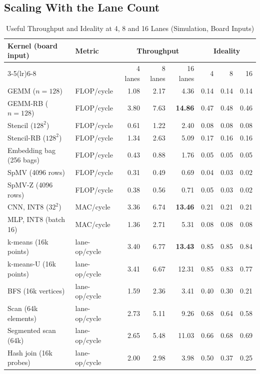 \documentclass[journal]{IEEEtran}
\begin{document}
\subsection{Scaling With the Lane Count}\label{sec:evallanes}
\begin{table}[t]
\caption{Useful Throughput and Ideality at 4, 8 and 16 Lanes (Simulation, Board Inputs)}
\label{tab:lanes_tp}
\centering\footnotesize
\setlength{\tabcolsep}{4.5pt}
\begin{tabular}{llrrrrrr}
\toprule
Kernel (board input) & Metric & \multicolumn{3}{c}{Throughput} & \multicolumn{3}{c}{Ideality}\\
\cmidrule(lr){3-5}\cmidrule(lr){6-8}
 & & 4 lanes & 8 lanes & 16 lanes & 4 & 8 & 16\\
\midrule
GEMM ($n=128$)             & FLOP/cycle    & 1.08 & 2.17 & 4.36           & 0.14 & 0.14 & 0.14\\
GEMM-RB ($n=128$)          & FLOP/cycle    & 3.80 & 7.63 & \textbf{14.86} & 0.47 & 0.48 & 0.46\\
Stencil ($128^2$)          & FLOP/cycle    & 0.61 & 1.22 & 2.40           & 0.08 & 0.08 & 0.08\\
Stencil-RB ($128^2$)       & FLOP/cycle    & 1.34 & 2.63 & 5.09           & 0.17 & 0.16 & 0.16\\
Embedding bag (256 bags)   & FLOP/cycle    & 0.43 & 0.88 & 1.76           & 0.05 & 0.05 & 0.05\\
SpMV (4096 rows)           & FLOP/cycle    & 0.31 & 0.49 & 0.69           & 0.04 & 0.03 & 0.02\\
SpMV-Z (4096 rows)         & FLOP/cycle    & 0.38 & 0.56 & 0.71           & 0.05 & 0.03 & 0.02\\
CNN, INT8 ($32^2$)         & MAC/cycle     & 3.36 & 6.74 & \textbf{13.46} & 0.21 & 0.21 & 0.21\\
MLP, INT8 (batch 16)       & MAC/cycle     & 1.36 & 2.71 & 5.31           & 0.08 & 0.08 & 0.08\\
k-means (16k points)       & lane-op/cycle & 3.40 & 6.77 & \textbf{13.43} & 0.85 & 0.85 & 0.84\\
k-means-U (16k points)     & lane-op/cycle & 3.41 & 6.67 & 12.31          & 0.85 & 0.83 & 0.77\\
BFS (16k vertices)         & lane-op/cycle & 1.59 & 2.36 & 3.41           & 0.40 & 0.30 & 0.21\\
Scan (64k elements)        & lane-op/cycle & 2.73 & 5.11 & 9.26           & 0.68 & 0.64 & 0.58\\
Segmented scan (64k)       & lane-op/cycle & 2.65 & 5.48 & 11.03          & 0.66 & 0.68 & 0.69\\
Hash join (16k probes)     & lane-op/cycle & 2.00 & 2.98 & 3.98           & 0.50 & 0.37 & 0.25\\
\bottomrule
\end{tabular}


\end{table}
\end{document}
